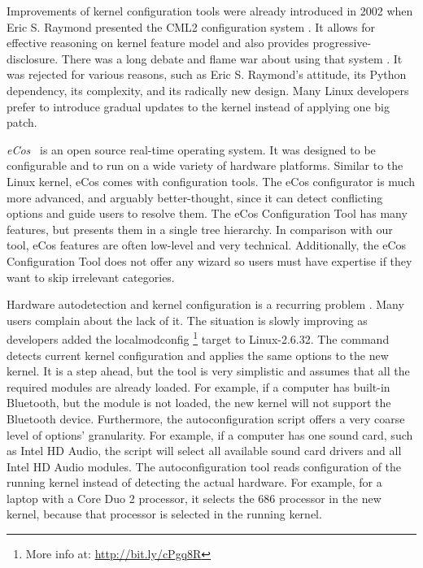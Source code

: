 \documentclass{chi2009}
\begin{document}
Improvements of kernel configuration tools were already introduced in 2002 when Eric S. Raymond presented the CML2 configuration system
\cite{raymond:cml2:2000}. It allows for effective reasoning on kernel feature model and also provides progressive-disclosure. There was a long debate and flame
war about using that system \cite{kerneltrap:linux:2002}. It was rejected for various reasons, such as Eric S. Raymond's attitude, its Python dependency, its
complexity, and its radically new design. Many Linux developers prefer to introduce gradual updates to the kernel instead of applying one big patch.

\textit{eCos}~\cite{veer:ecos:2000} is an open source real-time operating system. It was designed to be configurable and to run on a wide variety of hardware
platforms. Similar to the Linux kernel, eCos comes with configuration tools. The eCos configurator is much more advanced, and arguably better-thought, since
it can detect conflicting options and guide users to resolve them. The eCos Configuration Tool has many features, but presents them in a single tree hierarchy.
In comparison with our tool, eCos features are often low-level and very technical. Additionally, the eCos Configuration Tool does not offer any wizard so users
must have expertise if they want to skip irrelevant categories.

Hardware autodetection and kernel configuration is a recurring problem \cite{debian:config:2010,soft32:config:2007}. Many users complain about the lack of it.
The situation is slowly improving as developers added the \textsf{localmodconfig} \footnote{More info at: \url{http://bit.ly/cPgq8R}} target to Linux-2.6.32.
The command detects current kernel configuration and applies the same options to the new kernel. It is a step ahead, but the tool is very simplistic and assumes
that all the required modules are already loaded. For example, if a computer has built-in Bluetooth, but the module is not loaded, the new kernel will not
support the Bluetooth device. Furthermore, the autoconfiguration script offers a very coarse level of options' granularity. For example, if a computer has one
sound card, such as Intel HD Audio, the script will select all available sound card drivers and all Intel HD Audio modules. The autoconfiguration tool reads
configuration of the running kernel instead of detecting the actual hardware. For example, for a laptop with a Core Duo 2 processor, it selects the 686
processor in the new kernel, because that processor is selected in the running kernel.
\end{document}
